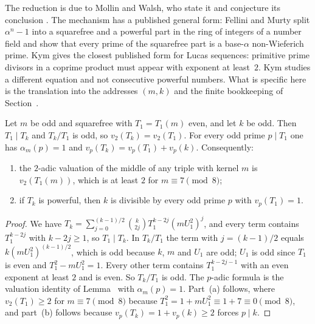 The reduction is due to Mollin and Walsh, who state it and conjecture its conclusion \cite[p.~111]{MollinWalsh1986a}. The mechanism
has a published general form: Fellini and Murty \cite[Lemma~5.6]{FelliniMurty2026} split $\alpha^n - 1$ into a squarefree and a powerful
part in the ring of integers of a number field and show that every prime of the squarefree part is a base-$\alpha$ non-Wieferich prime.
Kym \cite[Corollary~6.6 and Remark~6.7]{Kym2026} gives the closest published form for Lucas sequences: primitive prime divisors in a
coprime product must appear with exponent at least~$2$. Kym studies a different equation and not consecutive powerful numbers. What is
specific here is the translation into the addresses $(m, k)$ and the finite bookkeeping of Section~.

\begin{lemma}
Let $m$ be odd and squarefree with $T_1 = T_1(m)$ even, and let $k$ be odd. Then $T_1 \mid T_k$ and $T_k/T_1$ is odd, so
$v_2(T_k) = v_2(T_1)$. For every odd prime $p \mid T_1$ one has $\alpha_m(p) = 1$ and $v_p(T_k) = v_p(T_1) + v_p(k)$. Consequently:
\begin{enumerate}
  \item[(a)] the $2$-adic valuation of the middle of any triple with kernel $m$ is $v_2(T_1(m))$, which is at least $2$ for
  $m \equiv 7 \pmod 8$;
  \item[(b)] if $T_k$ is powerful, then $k$ is divisible by every odd prime $p$ with $v_p(T_1) = 1$.
\end{enumerate}
\end{lemma}

\begin{proof}
We have $T_k = \sum_{j=0}^{(k-1)/2} \binom{k}{2j} T_1^{k-2j} (m U_1^2)^j$, and every term contains $T_1^{k-2j}$ with $k - 2j \ge 1$, so
$T_1 \mid T_k$. In $T_k/T_1$ the term with $j = (k-1)/2$ equals $k (m U_1^2)^{(k-1)/2}$, which is odd because $k$, $m$ and $U_1$ are odd;
$U_1$ is odd since $T_1$ is even and $T_1^2 - m U_1^2 = 1$. Every other term contains $T_1^{k-2j-1}$ with an even exponent at least $2$ and is
even. So $T_k/T_1$ is odd. The $p$-adic formula is the valuation identity of Lemma~ with $\alpha_m(p) = 1$. Part~(a)
follows, where $v_2(T_1) \ge 2$ for $m \equiv 7 \pmod 8$ because $T_1^2 = 1 + m U_1^2 \equiv 1 + 7 \equiv 0 \pmod 8$, and part~(b) follows because $v_p(T_k) = 1 + v_p(k) \ge 2$ forces $p \mid k$.
\end{proof}

